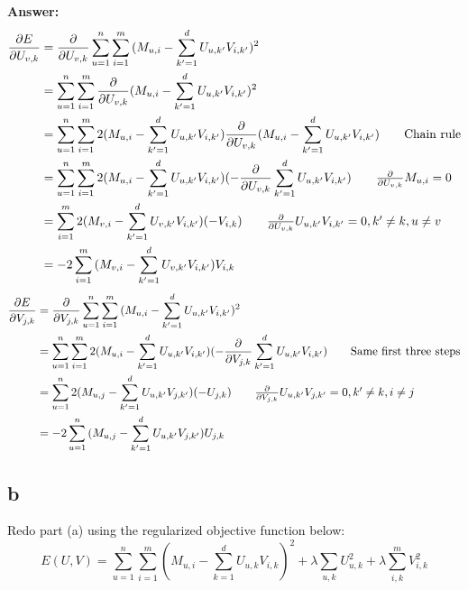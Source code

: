 \documentclass{article}
\begin{document}
\textbf{Answer:}
\begin{align*}
    \frac{\partial E}{\partial U_{v,k}} &= \frac{\partial}{\partial U_{v,k}}\sum_{u=1}^n\sum_{i=1}^m{(M_{u,i} - \sum_{k'=1}^d{U_{u,k'}V_{i,k'}})^2}\\
    &= \sum_{u=1}^n\sum_{i=1}^m{\frac{\partial}{\partial U_{v,k}}(M_{u,i} - \sum_{k'=1}^d{U_{u,k'}V_{i,k'}})^2}\\
    &= \sum_{u=1}^n\sum_{i=1}^m{2(M_{u,i} - \sum_{k'=1}^d{U_{u,k'}V_{i,k'}})\frac{\partial}{\partial U_{v,k}}(M_{u,i} - \sum_{k'=1}^d{U_{u,k'}V_{i,k'}})}\tag*{\text{Chain rule}}\\
    &= \sum_{u=1}^n\sum_{i=1}^m{2(M_{u,i} - \sum_{k'=1}^d{U_{u,k'}V_{i,k'}})(-\frac{\partial}{\partial U_{v,k}}\sum_{k'=1}^d{U_{u,k'}V_{i,k'}})}\tag*{$\frac{\partial}{\partial U_{v,k}}M_{u,i} = 0$}\\
    &= \sum_{i=1}^m{2(M_{v,i} - \sum_{k'=1}^d{U_{v,k'}V_{i,k'}})(-V_{i,k})}\tag*{$\frac{\partial}{\partial U_{v,k}}U_{u,k'}V_{i,k'} = 0, k' \neq k, u \neq v$}\\
    &= -2\sum_{i=1}^m{(M_{v,i} - \sum_{k'=1}^d{U_{v,k'}V_{i,k'}})V_{i,k}}
\end{align*}
\begin{align*}
    \frac{\partial E}{\partial V_{j,k}} &= \frac{\partial}{\partial V_{j,k}}\sum_{u=1}^n\sum_{i=1}^m{(M_{u,i} - \sum_{k'=1}^d{U_{u,k'}V_{i,k'}})^2}\\
    &= \sum_{u=1}^n\sum_{i=1}^m{2(M_{u,i} - \sum_{k'=1}^d{U_{u,k'}V_{i,k'}})(-\frac{\partial}{\partial V_{j,k}}\sum_{k'=1}^d{U_{u,k'}V_{i,k'}})}\tag*{\text{Same first three steps}}\\
    &= \sum_{u=1}^n{2(M_{u,j} - \sum_{k'=1}^d{U_{u,k'}V_{j,k'}})(-U_{j,k})}\tag*{\text{$\frac{\partial}{\partial V_{j,k}}U_{u,k'}V_{j,k'} = 0, k' \neq k, i \neq j$}}\\
    &= -2\sum_{u=1}^n{(M_{u,j} - \sum_{k'=1}^d{U_{u,k'}V_{j,k'}})U_{j,k}}
\end{align*}

\subsection{b}
Redo part (a) using the regularized objective function below:
$$E(U,V) = \sum_{u=1}^n\sum_{i=1}^m{(M_{u,i} - \sum_{k=1}^d{U_{u,k}V_{i,k}})^2} + \lambda\sum_{u, k}{U_{u,k}^2} + \lambda\sum_{i,k}^m{V_{i,k}^2}$$
\end{document}
